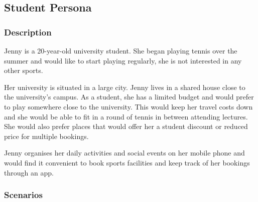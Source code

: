 \subsection{Student Persona}
\label{sub:student_persona}


\subsubsection*{Description}
\label{ssub:student_description}

Jenny is a 20-year-old university student. She began playing tennis
over the summer and would like to start playing regularly, she is not
interested in any other sports.

Her university is situated in a large city. Jenny lives in a shared
house close to the university's campus. As a student, she has a limited
budget and would prefer to play somewhere close to the university. This
would keep her travel costs down and she would be able to fit in a
round of tennis in between attending lectures. She would also prefer
places that would offer her a student discount or reduced price for
multiple bookings.

Jenny organises her daily activities and social events on her mobile
phone and would find it convenient to book sports facilities and keep
track of her bookings through an app.


\subsubsection*{Scenarios}
\label{ssub:student_scenarios}

